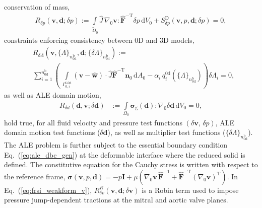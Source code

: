 conservation of mass,
\begin{align}
    R_{\delta p}(\boldsymbol{v},\boldsymbol{d};\delta p) := 
    \int\limits_{\tilde{\mathit{\Omega}}_0} \widehat{J}\,\nabla_{0}\boldsymbol{v} : \widehat{\boldsymbol{F}}^{-\mathrm{T}}\delta p\,\mathrm{d}V_0 + S_{\delta p}^{\mathrm{D}}(\boldsymbol{v},p,\boldsymbol{d};\delta p) = 0,\label{eq:frsi_weakform_p}
\end{align}
constraints enforcing consistency between 0D and 3D models,
\begin{equation}
\begin{aligned}
    &R_{\delta\mathit{\Lambda}} \left(\boldsymbol{v}, \{\mathit{\Lambda}\}_{n_{\mathrm{0d}}^{\mathrm{b}}}, \boldsymbol{d}; \{\delta\mathit{\Lambda}\}_{n_{\mathrm{0d}}^{\mathrm{b}}}\right) := \\
    &\sum\limits_{i=1}^{n_{\mathrm{0d}}^{\mathrm{b}}} \left(\,\int\limits_{\mathit{\Gamma}_{0,i}^{\mathrm{f}\text{-}\mathrm{0d}}} (\boldsymbol{v}-\widehat{\boldsymbol{w}})\cdot\widehat{J}\widehat{\boldsymbol{F}}^{-\mathrm{T}}\boldsymbol{n}_{0}\,\mathrm{d}A_0 - \alpha_i\,q_{i}^{\mathrm{0d}}\left(\{\mathit{\Lambda}\}_{n_{\mathrm{0d}}^{\mathrm{b}}}\right)\right)\delta\mathit{\Lambda}_{i} = 0,
    \label{eq:frsi_3d0d_coupling_weakform}
\end{aligned}
\end{equation}
as well as ALE domain motion,
\begin{align}
    R_{\delta d}(\boldsymbol{d},\boldsymbol{v};\delta\boldsymbol{d}) &:= \int\limits_{\mathit{\Omega}_0}\boldsymbol{\sigma}_{\mathrm{g}}(\boldsymbol{d}) : \nabla_{0}\delta\boldsymbol{d}\,\mathrm{d}V_0 = 0,\label{eq:ale_weakform}
\end{align}
hold true, for all fluid velocity and pressure test functions $\left(\delta\boldsymbol{v},\, \delta p\right)$, ALE domain motion test functions ($\delta\boldsymbol{d}$), as well as multiplier test functions ($\{\delta\mathit{\Lambda}\}_{n_{\mathrm{0d}}^{\mathrm{b}}}$). The ALE problem is further subject to the essential boundary condition Eq.~(\ref{eq:ale_dbc_gen}) at the deformable interface where the reduced solid is defined. The constitutive equation for the Cauchy stress is written with respect to the reference frame, $\boldsymbol{\sigma}(\boldsymbol{v},p,\boldsymbol{d}) = -p \boldsymbol{I} + \mu \left(\nabla_0 \boldsymbol{v}\,\widehat{\boldsymbol{F}}^{-1} + \widehat{\boldsymbol{F}}^{-\mathrm{T}}(\nabla_0 \boldsymbol{v})^{\mathrm{T}}\right)$. In Eq.~(\ref{eq:frsi_weakform_v}), $R_{\delta v}^{R}(\boldsymbol{v},\boldsymbol{d};\delta\boldsymbol{v})$ is a Robin term used to impose pressure jump-dependent tractions at the mitral and aortic valve planes.
